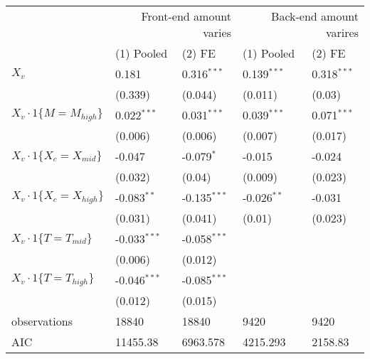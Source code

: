 \begin{tabular}{lllll}
\hline
 & \multicolumn{2}{r}{Front-end amount varies} & \multicolumn{2}{r}{Back-end amount varires} \\
 & (1) Pooled & (2) FE & (1) Pooled & (2) FE \\
\hline
$X_v$ & 0.181 & 0.316$^{***}$ & 0.139$^{***}$ & 0.318$^{***}$ \\
 & (0.339) & (0.044) & (0.011) & (0.03) \\
$X_v\cdot1\{M=M_{high}\}$ & 0.022$^{***}$ & 0.031$^{***}$ & 0.039$^{***}$ & 0.071$^{***}$ \\
 & (0.006) & (0.006) & (0.007) & (0.017) \\
$X_v\cdot1\{X_c=X_{mid}\}$ & -0.047 & -0.079$^{*}$ & -0.015 & -0.024 \\
 & (0.032) & (0.04) & (0.009) & (0.023) \\
$X_v\cdot1\{X_c=X_{high}\}$ & -0.083$^{**}$ & -0.135$^{***}$ & -0.026$^{**}$ & -0.031 \\
 & (0.031) & (0.041) & (0.01) & (0.023) \\
$X_v\cdot1\{T=T_{mid}\}$ & -0.033$^{***}$ & -0.058$^{***}$ &  &  \\
 & (0.006) & (0.012) &  &  \\
$X_v\cdot1\{T=T_{high}\}$ & -0.046$^{***}$ & -0.085$^{***}$ &  &  \\
 & (0.012) & (0.015) &  &  \\\hline

observations & 18840 & 18840 & 9420 & 9420 \\
AIC & 11455.38 & 6963.578 & 4215.293 & 2158.83 \\
\hline
\end{tabular}
